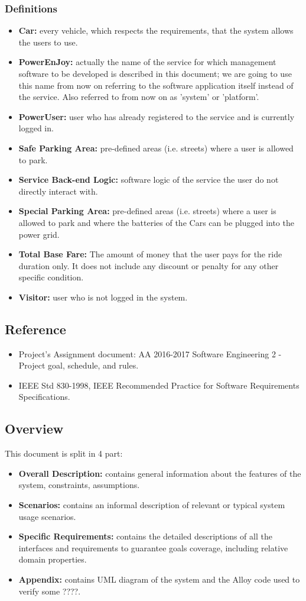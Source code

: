 \subsubsection{Definitions}
\begin{itemize}
\item \textbf{Car:} every vehicle, which respects the requirements, that the system allows the users to use.
\item \textbf{PowerEnJoy:} actually the name of the service for which management software to be developed is described in this document; we are going to use this name from now on referring to the software application itself instead of the service. Also referred to from now on as 'system' or 'platform'.
\item \textbf{PowerUser:} user who has already registered to the service and is currently logged in.
\item \textbf{Safe Parking Area:} pre-defined areas (i.e. streets) where a user is allowed to park.
\item \textbf{Service Back-end Logic:} software logic of the service the user do not directly interact with. 
\item \textbf{Special Parking Area:}  pre-defined areas (i.e. streets) where a user is allowed to park and where the batteries of the Cars can be plugged into the power grid.
\item \textbf{Total Base Fare:} The amount of money that the user pays for the ride duration only. It does not include any discount or penalty for any other specific condition.
\item \textbf{Visitor:} user who is not logged in the system.
\end{itemize}
\subsection{Reference}
\begin{itemize}
\item Project's Assignment document: AA 2016-2017 Software Engineering 2 - Project goal, schedule, and rules.
\item IEEE Std 830-1998, IEEE Recommended Practice for Software Requirements Specifications.
\end{itemize}
\subsection{Overview}
This document is split in 4 part:
\begin{itemize}
\item \textbf{Overall Description:} contains general information about the features of the system, constraints, assumptions. 
\item \textbf{Scenarios:} contains an informal description of relevant or typical system usage scenarios.
\item \textbf{Specific Requirements:} contains the detailed descriptions of all the interfaces and requirements to guarantee goals coverage, including relative domain properties. 
\item \textbf{Appendix:} contains UML diagram of the system and the Alloy code used to verify some ????.
\end{itemize}
